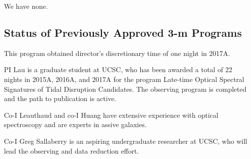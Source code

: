 \documentclass[letterpaper,12pt]{article}
\begin{document}
We have none. 

\subsection{Status of Previously Approved 3-m Programs}

This program obtained director's discretionary time of one night in 2017A.

PI Lau is a graduate student at UCSC, who has been awarded a total of 22 nights in 2015A, 2016A, 
and 2017A for the program Late-time Optical Spectral Signatures of Tidal Disruption Candidates. 
The observing program is completed and the path to publication is active. 

Co-I Leauthaud and co-I Huang have extensive experience with optical spectroscopy and are experts 
in assive galaxies. 

Co-I Greg Sallaberry is an aspiring undergraduate researcher at UCSC, who will lead the observing 
and data reduction effort. 
\end{document}
